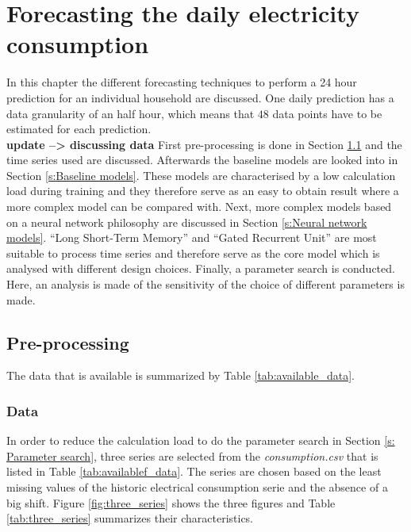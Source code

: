 \chapter{Forecasting the daily electricity consumption}
\label{cha:Forecasting the daily electricity consumption}
In this chapter the different forecasting techniques to perform a 24 hour prediction for an individual household are discussed. One daily prediction has a data granularity of an half hour, which means that $ 48 $ data points have to be estimated for each prediction. \\\textbf{update --> discussing data}
First pre-processing is done in Section \ref{s:Pre-processing} and the time series used are discussed. Afterwards the baseline models are looked into in Section \ref{s:Baseline models}. These models are characterised by a low calculation load during training and they therefore serve as an easy to obtain result where a more complex model can be compared with. Next, more complex models based on a neural network philosophy are discussed in Section \ref{s:Neural network models}. ``Long Short-Term Memory'' and ``Gated Recurrent Unit'' are most suitable to process time series and therefore serve as the core model which is analysed with different design choices. Finally, a parameter search is conducted. Here, an analysis is made of the sensitivity of the choice of different parameters is made.\\
 
\section{Pre-processing}\label{s:Pre-processing}
The data that is available is summarized by Table \ref{tab:available_data}. 

\subsection{Data}
In order to reduce the calculation load to do the parameter search in Section \ref{s: Parameter search}, three series are selected from the \textit{consumption.csv} that is listed in Table \ref{tab:availablef_data}. The series are chosen based on the least missing values of the historic electrical consumption serie and the absence of a big shift. Figure \ref{fig:three_series} shows the three figures and Table \ref{tab:three_series} summarizes their characteristics.\\

